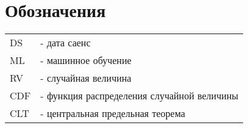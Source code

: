 \chapter*{Обозначения}

\begin{tabular}{ l l }
 DS & - дата саенс \\ 
 ML & - машинное обучение \\ 
 RV & - случайная величина \\
 CDF & - функция распределения случайной величины \\
 CLT & - центральная предельная теорема
\end{tabular}
